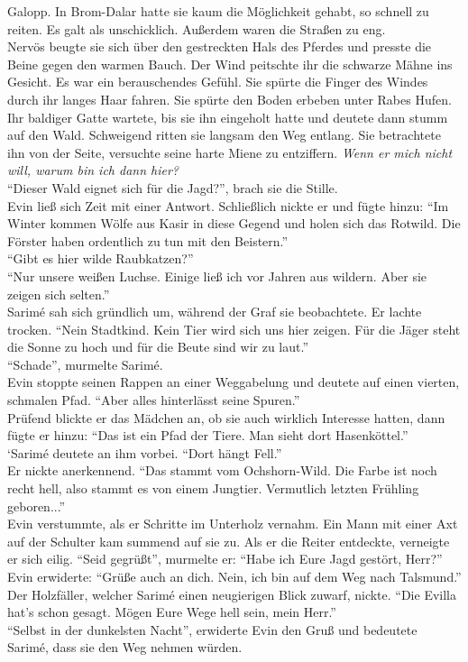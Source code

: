 Galopp. In Brom-Dalar hatte sie kaum die Möglichkeit gehabt, so schnell zu reiten. Es galt als 
unschicklich. Außerdem waren die Straßen zu eng.\\
Nervös beugte sie sich über den gestreckten Hals des Pferdes und presste die Beine gegen den warmen 
Bauch. Der Wind peitschte ihr die schwarze Mähne ins Gesicht. Es war ein berauschendes Gefühl. Sie 
spürte die Finger des Windes durch ihr langes Haar fahren. Sie spürte den Boden erbeben unter Rabes 
Hufen.\\
Ihr baldiger Gatte wartete, bis sie ihn eingeholt hatte und deutete dann stumm auf den Wald. 
Schweigend ritten sie langsam den Weg entlang. Sie betrachtete ihn von der Seite, versuchte seine 
harte Miene zu entziffern. \textit{Wenn er mich nicht will, warum bin ich dann hier?}\\
``Dieser Wald eignet sich für die Jagd?'', brach sie die Stille.\\
Evin ließ sich Zeit mit einer Antwort. Schließlich nickte er und fügte hinzu: ``Im Winter kommen 
Wölfe aus Kasir in diese Gegend und holen sich das Rotwild. Die Förster haben ordentlich zu tun mit 
den Beistern.''\\
``Gibt es hier wilde Raubkatzen?''\\
``Nur unsere weißen Luchse. Einige ließ ich vor Jahren aus wildern. Aber sie zeigen sich selten.''\\
Sarimé sah sich gründlich um, während der Graf sie beobachtete. Er lachte trocken. ``Nein 
Stadtkind. Kein Tier wird sich uns hier zeigen. Für die Jäger steht die Sonne zu hoch und für die 
Beute sind wir zu laut.''\\
``Schade'', murmelte Sarimé.\\
Evin stoppte seinen Rappen an einer Weggabelung und deutete auf einen vierten, schmalen Pfad. 
``Aber alles hinterlässt seine Spuren.''\\
Prüfend blickte er das Mädchen an, ob sie auch wirklich Interesse hatten, dann fügte er hinzu: 
``Das ist ein Pfad der Tiere. Man sieht dort Hasenköttel.''\\
`Sarimé deutete an ihm vorbei. ``Dort hängt Fell.''\\
Er nickte anerkennend. ``Das stammt vom Ochshorn-Wild. Die Farbe ist noch recht hell, also stammt 
es von einem Jungtier. Vermutlich letzten Frühling geboren...''\\
Evin verstummte, als er Schritte im Unterholz vernahm. Ein Mann mit einer Axt auf der Schulter kam 
summend auf sie zu. Als er die Reiter entdeckte, verneigte er sich eilig. ``Seid gegrüßt'', 
murmelte er: ``Habe ich Eure Jagd gestört, Herr?''\\
Evin erwiderte: ``Grüße auch an dich. Nein, ich bin auf dem Weg nach Talsmund.''\\
Der Holzfäller, welcher Sarimé einen neugierigen Blick zuwarf, nickte. ``Die Evilla hat's schon 
gesagt. Mögen Eure Wege hell sein, mein Herr.''\\
``Selbst in der dunkelsten Nacht'', erwiderte Evin den Gruß und bedeutete Sarimé, dass sie den 
Weg nehmen würden.\\

